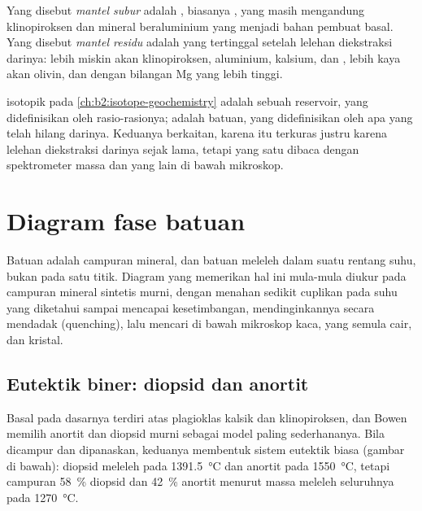 \begin{definition}\label{def:b2:mantle-melting:fertility}
Yang disebut \emph{mantel subur} adalah , biasanya
, yang masih mengandung klinopiroksen dan mineral beraluminium yang menjadi bahan
pembuat basal. Yang disebut \emph{mantel residu} adalah
 yang tertinggal setelah lelehan diekstraksi darinya: lebih miskin akan
klinopiroksen, aluminium, kalsium, dan , lebih kaya akan
olivin, dan dengan bilangan Mg yang lebih tinggi.
\end{definition}

 isotopik pada \cref{ch:b2:isotope-geochemistry} adalah sebuah reservoir,
yang didefinisikan oleh rasio-rasionya;  adalah batuan, yang didefinisikan oleh apa yang telah hilang darinya.
Keduanya berkaitan, karena  itu terkuras justru karena lelehan
diekstraksi darinya sejak lama, tetapi yang satu dibaca dengan spektrometer massa dan yang lain
di bawah mikroskop.

\section{Diagram fase batuan}\label{sec:b2:mantle-melting:diagrams}

Batuan adalah campuran mineral, dan batuan meleleh dalam suatu rentang suhu, bukan pada
satu titik. Diagram yang memerikan hal ini mula-mula diukur pada campuran
mineral sintetis murni, dengan menahan sedikit cuplikan pada suhu yang diketahui sampai
mencapai kesetimbangan, mendinginkannya secara mendadak (quenching), lalu mencari di bawah mikroskop kaca,
yang semula cair, dan kristal.

\subsection*{Eutektik biner: diopsid dan anortit}

Basal pada dasarnya terdiri atas plagioklas kalsik dan klinopiroksen, dan
Bowen memilih anortit dan diopsid murni sebagai model paling sederhananya. Bila dicampur dan dipanaskan,
keduanya membentuk sistem eutektik
biasa (gambar di bawah): diopsid meleleh pada \qty{1391.5}{\celsius} dan anortit
pada \qty{1550}{\celsius}, tetapi campuran \qty{58}{\percent} diopsid dan
\qty{42}{\percent} anortit menurut massa meleleh seluruhnya pada \qty{1270}{\celsius}.

